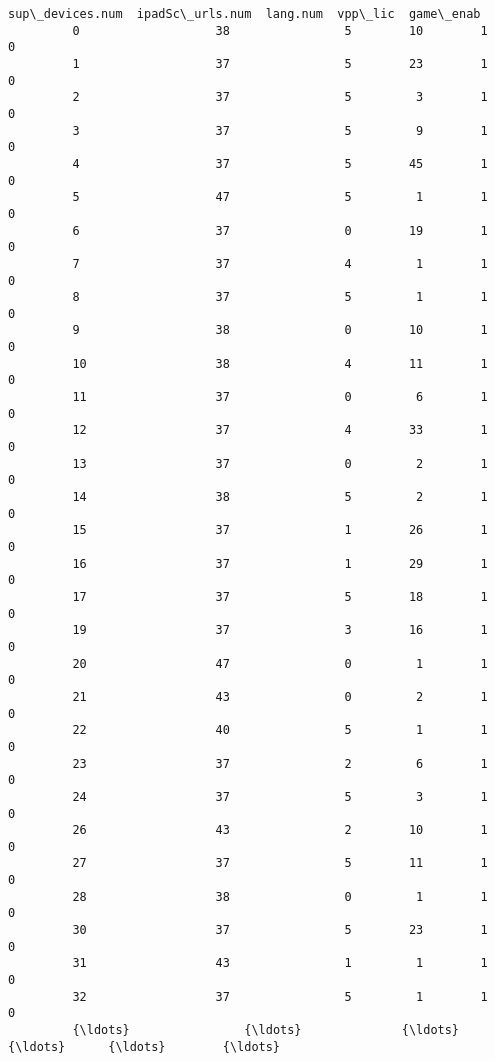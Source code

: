 \documentclass[11pt]{article}
\begin{document}
\begin{Verbatim}[commandchars=\\\{\}]
                sup\_devices.num  ipadSc\_urls.num  lang.num  vpp\_lic  game\_enab  
         0                   38                5        10        1          0  
         1                   37                5        23        1          0  
         2                   37                5         3        1          0  
         3                   37                5         9        1          0  
         4                   37                5        45        1          0  
         5                   47                5         1        1          0  
         6                   37                0        19        1          0  
         7                   37                4         1        1          0  
         8                   37                5         1        1          0  
         9                   38                0        10        1          0  
         10                  38                4        11        1          0  
         11                  37                0         6        1          0  
         12                  37                4        33        1          0  
         13                  37                0         2        1          0  
         14                  38                5         2        1          0  
         15                  37                1        26        1          0  
         16                  37                1        29        1          0  
         17                  37                5        18        1          0  
         19                  37                3        16        1          0  
         20                  47                0         1        1          0  
         21                  43                0         2        1          0  
         22                  40                5         1        1          0  
         23                  37                2         6        1          0  
         24                  37                5         3        1          0  
         26                  43                2        10        1          0  
         27                  37                5        11        1          0  
         28                  38                0         1        1          0  
         30                  37                5        23        1          0  
         31                  43                1         1        1          0  
         32                  37                5         1        1          0  
         {\ldots}                {\ldots}              {\ldots}       {\ldots}      {\ldots}        {\ldots}  

\end{Verbatim}
\end{document}
